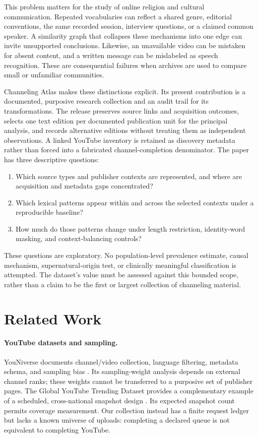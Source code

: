 This problem matters for the study of online religion and cultural communication. Repeated vocabularies can reflect a shared genre, editorial conventions, the same recorded session, interview questions, or a claimed common speaker. A similarity graph that collapses these mechanisms into one edge can invite unsupported conclusions. Likewise, an unavailable video can be mistaken for absent content, and a written message can be mislabeled as speech recognition. These are consequential failures when archives are used to compare small or unfamiliar communities.

Channeling Atlas makes these distinctions explicit. Its present contribution is a documented, purposive research collection and an audit trail for its transformations. The release preserves source links and acquisition outcomes, selects one text edition per documented publication unit for the principal analysis, and records alternative editions without treating them as independent observations. A linked YouTube inventory is retained as discovery metadata rather than forced into a fabricated channel-completion denominator. The paper has three descriptive questions:
\begin{enumerate}
\item Which source types and publisher contexts are represented, and where are acquisition and metadata gaps concentrated?
\item Which lexical patterns appear within and across the selected contexts under a reproducible baseline?
\item How much do those patterns change under length restriction, identity-word masking, and context-balancing controls?
\end{enumerate}
These questions are exploratory. No population-level prevalence estimate, causal mechanism, supernatural-origin test, or clinically meaningful classification is attempted. The dataset's value must be assessed against this bounded scope, rather than a claim to be the first or largest collection of channeling material.

\section{Related Work}
\paragraph{YouTube datasets and sampling.}
YouNiverse documents channel/video collection, language filtering, metadata schema, and sampling bias \citep{ribeiro2021youniverse}. Its sampling-weight analysis depends on external channel ranks; these weights cannot be transferred to a purposive set of publisher pages. The Global YouTube Trending Dataset provides a complementary example of a scheduled, cross-national snapshot design \citep{goncalves2026trending}. Its expected snapshot count permits coverage measurement. Our collection instead has a finite request ledger but lacks a known universe of uploads: completing a declared queue is not equivalent to completing YouTube.

